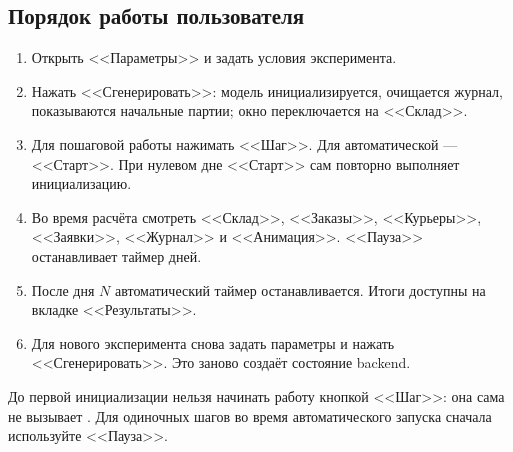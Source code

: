 \subsection{Порядок работы пользователя}
\begin{enumerate}
  \item Открыть <<Параметры>> и задать условия эксперимента.
  \item Нажать <<Сгенерировать>>: модель инициализируется, очищается журнал,
        показываются начальные партии; окно переключается на <<Склад>>.
  \item Для пошаговой работы нажимать <<Шаг>>. Для автоматической --- <<Старт>>.
        При нулевом дне <<Старт>> сам повторно выполняет инициализацию.
  \item Во время расчёта смотреть <<Склад>>, <<Заказы>>, <<Курьеры>>,
        <<Заявки>>, <<Журнал>> и <<Анимация>>. <<Пауза>> останавливает таймер дней.
  \item После дня $N$ автоматический таймер останавливается. Итоги доступны
        на вкладке <<Результаты>>.
  \item Для нового эксперимента снова задать параметры и нажать
        <<Сгенерировать>>. Это заново создаёт состояние backend.
\end{enumerate}
До первой инициализации нельзя начинать работу кнопкой <<Шаг>>: она сама
не вызывает . Для одиночных шагов во время
автоматического запуска сначала используйте <<Пауза>>.

